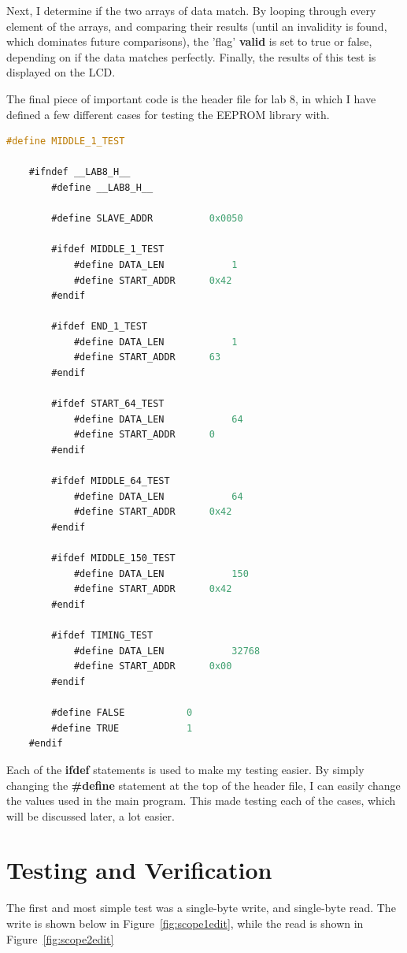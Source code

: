 \documentclass[a4paper, 12pt]{article}
\begin{document}
Next, I determine if the two arrays of data match. By looping through every element of the arrays, and comparing their results (until an invalidity is found, which dominates future comparisons), the 'flag' \textbf{valid} is set to true or false, depending on if the data matches perfectly. Finally, the results of this test is displayed on the LCD.

The final piece of important code is the header file for lab 8, in which I have defined a few different cases for testing the EEPROM library with. 

	\begin{mdframed}[backgroundcolor=code-gray, roundcorner=10pt,
								innerleftmargin=5, innertopmargin=5, innerbottommargin=5]	
	\begin{lstlisting}[language=C, caption=Main Header File, tabsize=2]
	#define MIDDLE_1_TEST

	#ifndef __LAB8_H__
		#define __LAB8_H__

		#define SLAVE_ADDR			0x0050

		#ifdef MIDDLE_1_TEST
			#define DATA_LEN			1
			#define START_ADDR		0x42
		#endif

		#ifdef END_1_TEST
			#define DATA_LEN			1
			#define START_ADDR		63
		#endif

		#ifdef START_64_TEST
			#define DATA_LEN			64
			#define START_ADDR  	0
		#endif

		#ifdef MIDDLE_64_TEST
			#define DATA_LEN			64
			#define START_ADDR		0x42
		#endif

		#ifdef MIDDLE_150_TEST
			#define DATA_LEN			150
			#define START_ADDR		0x42
		#endif

		#ifdef TIMING_TEST
			#define DATA_LEN			32768
			#define START_ADDR		0x00
		#endif

		#define FALSE			0
		#define TRUE			1
	#endif
	\end{lstlisting}
	\end{mdframed}
	
Each of the \textbf{ifdef} statements is used to make my testing easier. By simply changing the \textbf{\#define} statement at the top of the header file, I can easily change the values used in the main program. This made testing each of the cases, which will be discussed later, a lot easier.

\section{Testing and Verification}
The first and most simple test was a single-byte write, and single-byte read. The write is shown below in Figure~\ref{fig:scope1edit}, while the read is shown in Figure~\ref{fig:scope2edit}
\end{document}

